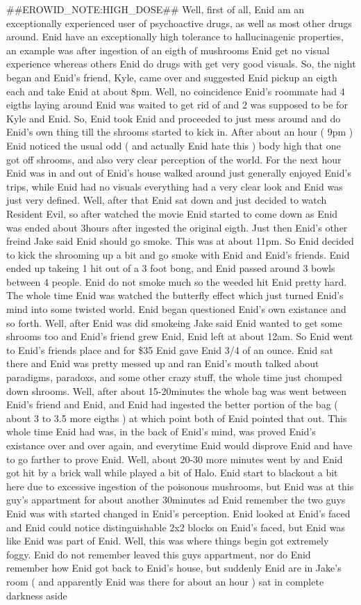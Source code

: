 \documentclass[12pt]{book}
\begin{document}
\#\#EROWID\_NOTE:HIGH\_DOSE\#\# Well, first of all, Enid am an exceptionally experienced user of psychoactive drugs, as well as most other drugs around. Enid have an exceptionally high tolerance to hallucinagenic properties, an example was after ingestion of an eigth of mushrooms Enid get no visual experience whereas others Enid do drugs with get very good visuals. So, the night began and Enid's friend, Kyle, came over and suggested Enid pickup an eigth each and take Enid at about 8pm. Well, no coincidence Enid's roommate had 4 eigths laying around Enid was waited to get rid of and 2 was supposed to be for Kyle and Enid. So, Enid took Enid and proceeded to just mess around and do Enid's own thing till the shrooms started to kick in. After about an hour ( 9pm ) Enid noticed the usual odd ( and actually Enid hate this ) body high that one got off shrooms, and also very clear perception of the world. For the next hour Enid was in and out of Enid's house walked around just generally enjoyed Enid's trips, while Enid had no visuals everything had a very clear look and Enid was just very defined. Well, after that Enid sat down and just decided to watch Resident Evil, so after watched the movie Enid started to come down as Enid was ended about 3hours after ingested the original eigth. Just then Enid's other freind Jake said Enid should go smoke. This was at about 11pm. So Enid decided to kick the shrooming up a bit and go smoke with Enid and Enid's friends. Enid ended up takeing 1 hit out of a 3 foot bong, and Enid passed around 3 bowls between 4 people. Enid do not smoke much so the weeded hit Enid pretty hard. The whole time Enid was watched the butterfly effect which just turned Enid's mind into some twisted world. Enid began questioned Enid's own existance and so forth. Well, after Enid was did smokeing Jake said Enid wanted to get some shrooms too and Enid's friend grew Enid, Enid left at about 12am. So Enid went to Enid's friends place and for \$35 Enid gave Enid 3/4 of an ounce. Enid sat there and Enid was pretty messed up and ran Enid's mouth talked about paradigms, paradoxs, and some other crazy stuff, the whole time just chomped down shrooms. Well, after about 15-20minutes the whole bag was went between Enid's friend and Enid, and Enid had ingested the better portion of the bag ( about 3 to 3.5 more eigths ) at which point both of Enid pointed that out. This whole time Enid had was, in the back of Enid's mind, was proved Enid's existance over and over again, and everytime Enid would disprove Enid and have to go farther to prove Enid. Well, about 20-30 more minutes went by and Enid got hit by a brick wall while played a bit of Halo. Enid start to blackout a bit here due to excessive ingestion of the poisonous mushrooms, but Enid was at this guy's appartment for about another 30minutes ad Enid remember the two guys Enid was with started changed in Enid's perception. Enid looked at Enid's faced and Enid could notice distinguishable 2x2 blocks on Enid's faced, but Enid was like Enid was part of Enid. Well, this was where things begin got extremely foggy. Enid do not remember leaved this guys appartment, nor do Enid remember how Enid got back to Enid's house, but suddenly Enid are in Jake's room ( and apparently Enid was there for about an hour ) sat in complete darkness aside 
\end{document}
